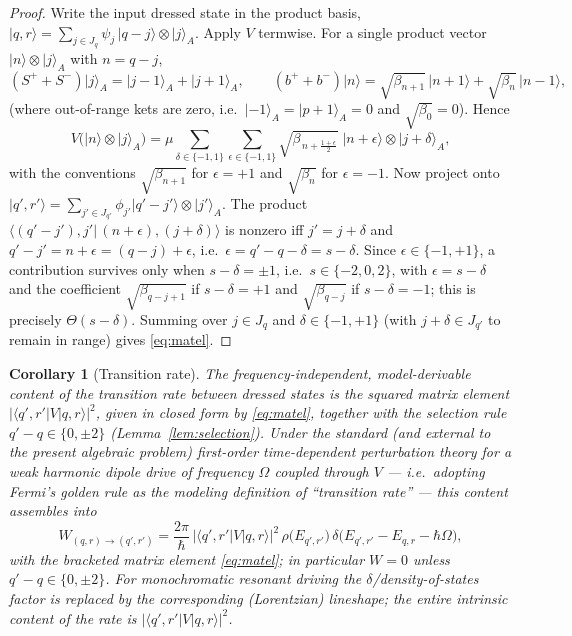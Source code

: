 \documentclass[12pt]{article}
\newtheorem{corollary}{Corollary}
\theoremstyle{definition}
\theoremstyle{remark}
\newcommand{\ket}[1]{\lvert #1\rangle}
\newcommand{\bra}[1]{\langle #1\rvert}
\newcommand{\bp}{b^{+}}
\newcommand{\bm}{b^{-}}
\begin{document}
\begin{proof}
Write the input dressed state in the product basis,
$\ket{q,r}=\sum_{j\in J_q}\psi_j\,\ket{q-j}\otimes\ket j_A$. Apply $V$ termwise.
For a single product vector $\ket{n}\otimes\ket j_A$ with $n=q-j$,
\[
(S^{+}+S^{-})\ket j_A=\ket{j-1}_A+\ket{j+1}_A,\qquad
(\bp+\bm)\ket n=\sqrt{\beta_{n+1}}\,\ket{n+1}+\sqrt{\beta_{n}}\,\ket{n-1},
\]
(where out-of-range kets are zero, i.e.\ $\ket{-1}_A=\ket{p+1}_A=0$ and
$\sqrt{\beta_0}=0$). Hence
\[
V\bigl(\ket{n}\otimes\ket j_A\bigr)
=\mu\!\!\sum_{\delta\in\{-1,1\}}\sum_{\epsilon\in\{-1,1\}}
\sqrt{\beta_{\,n+\tfrac{1+\epsilon}{2}}}\;\ket{n+\epsilon}\otimes\ket{j+\delta}_A ,
\]
with the conventions $\sqrt{\beta_{n+1}}$ for $\epsilon=+1$ and $\sqrt{\beta_{n}}$
for $\epsilon=-1$. Now project onto
$\ket{q',r'}=\sum_{j'\in J_{q'}}\phi_{j'}\ket{q'-j'}\otimes\ket{j'}_A$. The product
$\langle (q'-j'),j'|\,(n+\epsilon),(j+\delta)\rangle$ is nonzero iff $j'=j+\delta$
and $q'-j'=n+\epsilon=(q-j)+\epsilon$, i.e.\ $\epsilon=q'-q-\delta=s-\delta$. Since
$\epsilon\in\{-1,+1\}$, a contribution survives only when $s-\delta=\pm1$, i.e.\
$s\in\{-2,0,2\}$, with $\epsilon=s-\delta$ and the coefficient
$\sqrt{\beta_{q-j+1}}$ if $s-\delta=+1$ and $\sqrt{\beta_{q-j}}$ if $s-\delta=-1$;
this is precisely $\Theta(s-\delta)$. Summing over $j\in J_q$ and
$\delta\in\{-1,+1\}$ (with $j+\delta\in J_{q'}$ to remain in range) gives
\eqref{eq:matel}.
\end{proof}

\begin{corollary}[Transition rate]\label{cor:rate}
The frequency-independent, model-derivable content of the transition rate between
dressed states is the squared matrix element $|\bra{q',r'}V\ket{q,r}|^2$, given in
closed form by \eqref{eq:matel}, together with the selection rule
$q'-q\in\{0,\pm2\}$ (Lemma~\ref{lem:selection}). Under the standard (and external to
the present algebraic problem) first-order time-dependent perturbation theory for a
weak harmonic dipole drive of frequency $\Omega$ coupled through $V$ — i.e.\ adopting
Fermi's golden rule as the \emph{modeling} definition of ``transition rate'' — this
content assembles into
\begin{equation}\label{eq:rate}
W_{(q,r)\to(q',r')}
=\frac{2\pi}{\hbar}\,\bigl|\bra{q',r'}V\ket{q,r}\bigr|^2\,
\rho\bigl(E_{q',r'}\bigr)\,\delta\!\bigl(E_{q',r'}-E_{q,r}-\hbar\Omega\bigr),
\end{equation}
with the bracketed matrix element \eqref{eq:matel}; in particular $W=0$ unless
$q'-q\in\{0,\pm2\}$. For monochromatic resonant driving the
$\delta$/density-of-states factor is replaced by the corresponding (Lorentzian)
lineshape; the entire intrinsic content of the rate is $|\bra{q',r'}V\ket{q,r}|^2$.
\end{corollary}
\end{document}
